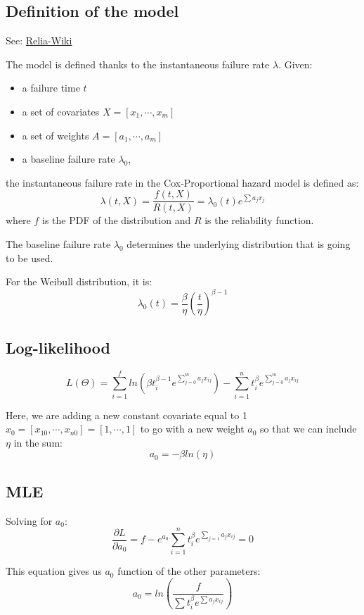 \documentclass[a4paper,11pt]{article}
\begin{document}
\subsection{Definition of the model}

See: \href{http://reliawiki.com/index.php/Proportional_Hazards_Model}{Relia-Wiki}

The model is defined thanks to the instantaneous failure rate $\lambda$.
Given:
\begin{itemize}
\item a failure time $t$
\item a set of covariates $X = [x_1,\cdots,x_m]$
\item a set of weights $A = [a_1,\cdots,a_m]$
\item a baseline failure rate $\lambda_0$,
\end{itemize}
the instantaneous failure rate in the Cox-Proportional hazard model is defined as:
$$\lambda(t,X) = \frac{f(t,X)}{R(t,X)} = \lambda_0 (t) e^{\sum a_j x_j} $$
where $f$ is the PDF of the distribution and $R$ is the reliability function.

The baseline failure rate $\lambda_0$ determines the underlying distribution that is going to be used.

For the Weibull distribution, it is:
$$\lambda_0 (t) = \frac{\beta}{\eta} \left( \frac{t}{\eta} \right)^{\beta - 1}$$

\subsection{Log-likelihood}

$$ L(\Theta) = \sum_{i=1}^{f} ln(\beta t_i^{\beta-1} e^{\sum\limits_{j=0}^m a_j x_{ij}}) - \sum_{i=1}^{n} t_i^{\beta} e^{\sum\limits_{j=0}^m a_j x_{ij}} $$

Here, we are adding a new constant covariate equal to 1  $x_0 = [x_{10},\cdots,x_{n0}] = [1,\cdots,1]$ to go with a new weight $a_0$ so that we can include $\eta$ in the sum:
$$ a_0 = -\beta ln(\eta)$$

\subsection{MLE}

Solving for $a_0$:
$$ \frac{\partial L}{\partial a_0} = f - e^{a_0} \sum_{i=1}^{n} t_i^{\beta} e^{\sum_{j=1} a_j x_{ij}} = 0 $$

This equation gives us $a_0$ function of the other parameters:
$$a_0 = ln \left( \frac{f}{\sum t_i^{\beta} e^{\sum a_j x_{ij}}} \right)$$
\end{document}
